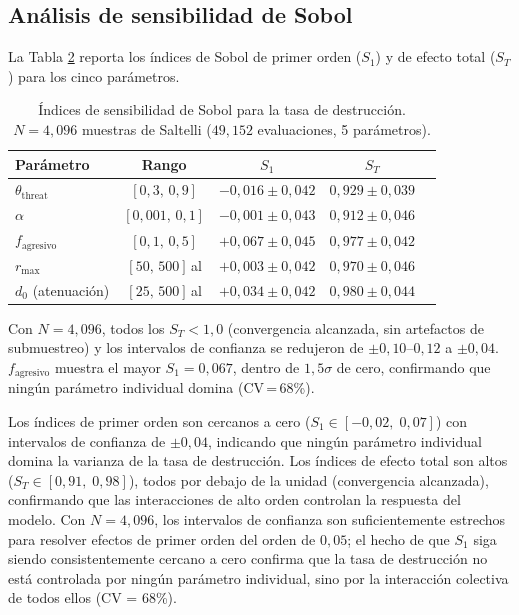 \documentclass[11pt,a4paper,onecolumn]{article}
\begin{document}
\begin{table}[h]
\subsection{Análisis de sensibilidad de Sobol}
\label{sec:sobol_results}

La Tabla \ref{tab:sobol} reporta los índices de Sobol de primer orden
($S_1$) y de efecto total ($S_T$) para los cinco parámetros.

\begin{table}
  \centering
  \caption{Índices de sensibilidad de Sobol para la tasa de destrucción.
           $N = 4{,}096$ muestras de Saltelli ($49{,}152$ evaluaciones,
           5 parámetros).}
  \label{tab:sobol}
  \begin{tabular}{lcccc}
    \toprule
    Parámetro & Rango & $S_1$ & $S_T$ \\
    \midrule
    $\theta_\text{threat}$ & $[0{,}3,\,0{,}9]$     & $-0{,}016\pm0{,}042$ & $0{,}929\pm0{,}039$ \\
    $\alpha$               & $[0{,}001,\,0{,}1]$   & $-0{,}001\pm0{,}043$ & $0{,}912\pm0{,}046$ \\
    $f_\text{agresivo}$    & $[0{,}1,\,0{,}5]$     & $+0{,}067\pm0{,}045$ & $0{,}977\pm0{,}042$ \\
    $r_\text{max}$         & $[50,\,500]$\,al       & $+0{,}003\pm0{,}042$ & $0{,}970\pm0{,}046$ \\
    $d_0$ (atenuación)     & $[25,\,500]$\,al       & $+0{,}034\pm0{,}042$ & $0{,}980\pm0{,}044$ \\
    \bottomrule
  \end{tabular}
  \begin{flushleft}
    \footnotesize
    Con $N = 4{,}096$, todos los $S_T < 1{,}0$ (convergencia alcanzada,
    sin artefactos de submuestreo) y los intervalos de confianza se
    redujeron de $\pm0{,}10$--$0{,}12$ a $\pm0{,}04$.
    $f_\text{agresivo}$ muestra el mayor $S_1 = 0{,}067$, dentro de
    $1{,}5\sigma$ de cero, confirmando que ningún parámetro individual
    domina (CV\,=\,68\%).
  \end{flushleft}
\end{table}

Los índices de primer orden son cercanos a cero
($S_1 \in [-0{,}02,\;0{,}07]$) con intervalos de confianza de
$\pm0{,}04$, indicando que ningún parámetro individual domina la
varianza de la tasa de destrucción.
Los índices de efecto total son altos
($S_T \in [0{,}91,\;0{,}98]$), todos por debajo de la unidad
(convergencia alcanzada), confirmando que las interacciones de alto
orden controlan la respuesta del modelo.
Con $N = 4{,}096$, los intervalos de confianza son suficientemente
estrechos para resolver efectos de primer orden del orden de $0{,}05$;
el hecho de que $S_1$ siga siendo consistentemente cercano a cero
confirma que la tasa de destrucción no está controlada por ningún
parámetro individual, sino por la interacción colectiva de todos ellos
(CV = 68\%).


\end{table}
\end{document}
